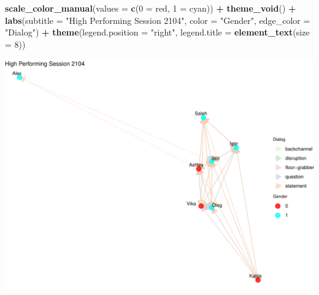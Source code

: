 \documentclass[
]{article}
\newenvironment{Shaded}{\begin{snugshade}}{\end{snugshade}}
\newcommand{\AttributeTok}[1]{\textcolor[rgb]{0.13,0.29,0.53}{#1}}
\newcommand{\DecValTok}[1]{\textcolor[rgb]{0.00,0.00,0.81}{#1}}
\newcommand{\FunctionTok}[1]{\textcolor[rgb]{0.13,0.29,0.53}{\textbf{#1}}}
\newcommand{\NormalTok}[1]{#1}
\newcommand{\OtherTok}[1]{\textcolor[rgb]{0.56,0.35,0.01}{#1}}
\newcommand{\SpecialCharTok}[1]{\textcolor[rgb]{0.81,0.36,0.00}{\textbf{#1}}}
\newcommand{\StringTok}[1]{\textcolor[rgb]{0.31,0.60,0.02}{#1}}
\begin{document}
\begin{Shaded}
\begin{Highlighting}[]
  \FunctionTok{scale\_color\_manual}\NormalTok{(}\AttributeTok{values =} \FunctionTok{c}\NormalTok{(}\StringTok{\textquotesingle{}0\textquotesingle{}} \OtherTok{=} \StringTok{\textquotesingle{}red\textquotesingle{}}\NormalTok{, }\StringTok{\textquotesingle{}1\textquotesingle{}} \OtherTok{=} \StringTok{\textquotesingle{}cyan\textquotesingle{}}\NormalTok{)) }\SpecialCharTok{+}
  \FunctionTok{theme\_void}\NormalTok{() }\SpecialCharTok{+}
  \FunctionTok{labs}\NormalTok{(}\AttributeTok{subtitle =} \StringTok{"High Performing Session 2104"}\NormalTok{, }\AttributeTok{color =} \StringTok{"Gender"}\NormalTok{, }\AttributeTok{edge\_color =} \StringTok{"Dialog"}\NormalTok{) }\SpecialCharTok{+}
  \FunctionTok{theme}\NormalTok{(}\AttributeTok{legend.position =} \StringTok{"right"}\NormalTok{, }\AttributeTok{legend.title =} \FunctionTok{element\_text}\NormalTok{(}\AttributeTok{size =} \DecValTok{8}\NormalTok{))}
\end{Highlighting}
\end{Shaded}

\begin{center}\includegraphics{low_surv_analysis_files/figure-latex/unnamed-chunk-7-1} \end{center}
\end{document}
